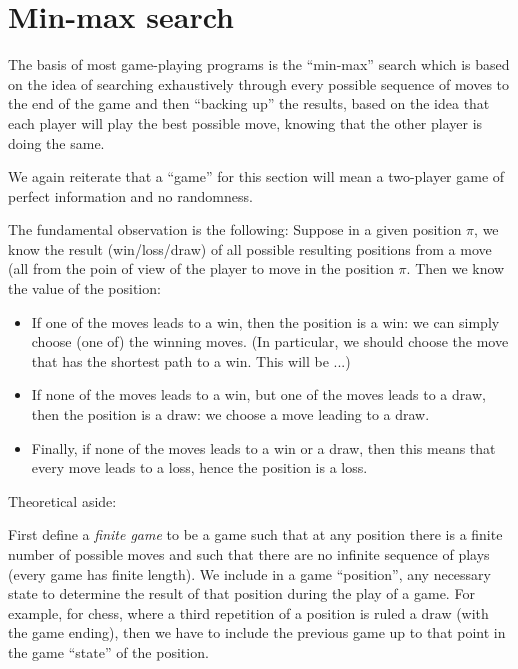 \documentclass[10pt,dvipdfmx,letterpaper]{report}
\begin{document}
\section{Min-max search}

The basis of most game-playing programs is the
``min-max'' search which is based on the idea of
searching exhaustively through every possible sequence
of moves to the end of the game and then ``backing up''
the results, based on the idea that each player will play
the best possible move, knowing that the other player is doing
the same.

We again reiterate that a ``game'' for this section will mean
a two-player game of perfect information and no randomness.

The fundamental observation is the following:
Suppose in a given position $\pi$, we know the result (win/loss/draw)
of all possible resulting positions from a move (all from the poin of view
of the player to move in the position $\pi$.  Then we know the value of the position:
\begin{itemize}
\item If one of the moves leads to a win, then the position is a win:
    we can simply choose (one of) the winning moves.  (In particular, we should
    choose the move that has the shortest path to a win.  This will be ...)
\item If none of the moves leads to a win, but one of the moves leads to a draw,
    then the position is a draw: we choose a move leading to a draw.
\item Finally, if none of the moves leads to a win or a draw,
    then this means that every move leads to a loss, hence the position is a loss.
\end{itemize}

Theoretical aside:

First define a {\em finite game} to be a game
such that at any position there is a finite number of possible
moves and such that there are no infinite sequence of plays (every game
has finite length).  We include in a game ``position'', any necessary
state to determine the result of that position during the play of a game.
For example, for chess, where a third repetition of a position is ruled a draw
(with the game ending), then we have to include the previous game up to that point
in the game ``state'' of the position.
\end{document}
